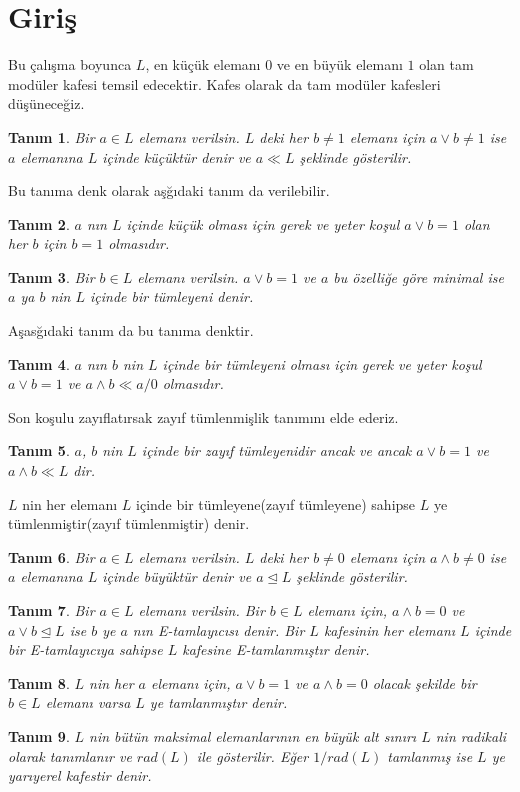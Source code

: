 \documentclass[a4paper,12pt]{article}
\numberwithin{equation}{section}
\theoremstyle{italik}
\newtheorem{tanim}{Tanım}[section]
\begin{document}
\section{Giriş}
Bu çalışma boyunca $L$, en küçük elemanı $0$ ve en büyük elemanı $1$ olan tam modüler kafesi temsil edecektir. Kafes olarak da tam modüler kafesleri düşüneceğiz. 
\begin{tanim}
Bir $a \in L $ elemanı verilsin. $ L $ deki her $ b \neq 1 $ elemanı için $ a \vee b \neq 1 $ ise $a$ elemanına $L$ içinde küçüktür denir
ve $ a\ll L $ şeklinde gösterilir.
\end{tanim}
Bu tanıma denk olarak aşğıdaki tanım da verilebilir.
\begin{tanim}
 $a$ nın $L$ içinde küçük olması için gerek ve yeter koşul $a \vee b = 1$ olan her $b$ için $b=1$ olmasıdır.
\end{tanim}
\begin{tanim}
 Bir $b \in L $ elemanı verilsin. $ a \vee b=1 $ ve $a$ bu özelliğe göre minimal ise $a$ ya $b$ nin $L$ içinde bir tümleyeni denir.
\end{tanim}
Aşasğıdaki tanım da bu tanıma denktir.
\begin{tanim}
$a$ nın $b$ nin $L$ içinde bir tümleyeni olması için gerek ve yeter koşul $a \vee b =1 $ ve $ a \wedge b \ll a/0 $ olmasıdır.
\end{tanim}
Son koşulu zayıflatırsak zayıf tümlenmişlik tanımını elde ederiz.
\begin{tanim}
$a$, $b$ nin $L$ içinde bir zayıf tümleyenidir ancak ve ancak $a \vee b =1 $ ve $ a \wedge b \ll L $ dir.
\end{tanim}
$L$ nin her elemanı $L$ içinde bir tümleyene(zayıf tümleyene) sahipse $L$ ye tümlenmiştir(zayıf tümlenmiştir) denir.
\begin{tanim}
Bir $a \in L $ elemanı verilsin. $ L $ deki her $ b \neq 0 $ elemanı için $ a \wedge b \neq 0 $ ise $a$ elemanına $L$ içinde büyüktür denir
ve $ a \trianglelefteq L $ şeklinde gösterilir.
\end{tanim}
\begin{tanim}
 Bir $a \in L $ elemanı verilsin. Bir $b \in L$ elemanı için, $ a \wedge b = 0 $ ve $ a \vee b \trianglelefteq L $ ise $b$ ye
$a$ nın \emph{E-tamlayıcısı} denir. Bir $L$ kafesinin her elemanı $L$ içinde bir E-tamlayıcıya sahipse $L$ kafesine \emph{E-tamlanmıştır} denir.
\end{tanim}
\begin{tanim}
 $L$ nin her $a$ elemanı için, $ a \vee b = 1 $ ve $ a \wedge b = 0 $ olacak şekilde bir $ b \in L $ elemanı varsa $L$ ye tamlanmıştır denir.
\end{tanim}
\begin{tanim}
 $L$ nin bütün maksimal elemanlarının en büyük alt sınırı $L$ nin radikali olarak tanımlanır ve $rad(L)$ ile gösterilir. Eğer $ 1/rad(L) $
tamlanmış ise $L$ ye \emph{yarıyerel} kafestir denir.
\end{tanim}
\end{document}

